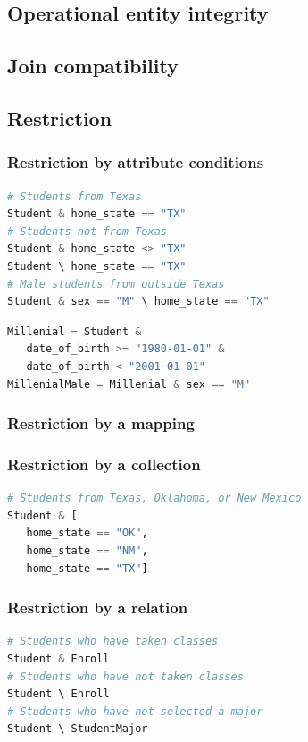 \documentclass[letter,10pt]{article}
\begin{document}
\subsection{Operational entity integrity}
\subsection{Join compatibility}
\subsection{Restriction}
\subsubsection{Restriction by attribute conditions}
\begin{lstlisting}[language=Python, caption={Restrictions by attribute conditions.}, label={lst:res1}]
# Students from Texas
Student & home_state == "TX"
# Students not from Texas
Student & home_state <> "TX"
Student \ home_state == "TX"
# Male students from outside Texas
Student & sex == "M" \ home_state == "TX"
\end{lstlisting}

\begin{lstlisting}[language=Python, caption={Assignment and use of relational variables.}, label={lst:res2}]
Millenial = Student & 
   date_of_birth >= "1980-01-01" & 
   date_of_birth < "2001-01-01"
MillenialMale = Millenial & sex == "M"
\end{lstlisting}

\subsubsection{Restriction by a mapping}

\subsubsection{Restriction by a collection}
\begin{lstlisting}[language=Python, caption={Restrictions by a collection of conditions.}, label={lst:res4}]
# Students from Texas, Oklahoma, or New Mexico
Student & [
   home_state == "OK", 
   home_state == "NM", 
   home_state == "TX"] 
\end{lstlisting}


\subsubsection{Restriction by a relation}
\begin{lstlisting}[language=Python, caption={Restrictions by another entity.}, label={lst:res5}]
# Students who have taken classes
Student & Enroll
# Students who have not taken classes
Student \ Enroll
# Students who have not selected a major
Student \ StudentMajor
\end{lstlisting}
\end{document}
